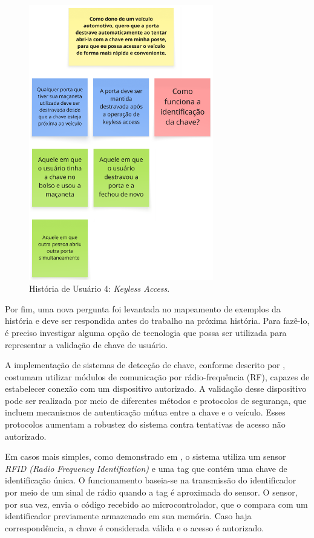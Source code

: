 \begin{figure}[H]
\centering
\includegraphics[height=12cm]{figuras/user_story_4.png}
\caption{História de Usuário 4: \textit{Keyless Access}.}
\label{fig:historia4}
\end{figure}

Por fim, uma nova pergunta foi levantada no mapeamento de exemplos da história e deve ser respondida antes do trabalho na próxima história. Para fazê-lo, é 
preciso investigar alguma opção de tecnologia que possa ser utilizada para representar a validação de chave de usuário. 

A implementação de sistemas de detecção de chave, conforme descrito por , costumam utilizar módulos de comunicação por rádio-frequência (RF), 
capazes de estabelecer conexão com um dispositivo autorizado. A validação desse dispositivo pode ser realizada por meio de diferentes métodos e protocolos de segurança, 
que incluem mecanismos de autenticação mútua entre a chave e o veículo. Esses protocolos aumentam a robustez do sistema contra tentativas de acesso não autorizado.

Em casos mais simples, como demonstrado em , o sistema utiliza um sensor \textit{RFID (Radio Frequency Identification)} e uma tag que contém uma chave 
de identificação única. O funcionamento baseia-se na transmissão do identificador por meio de um sinal de rádio quando a tag é aproximada do sensor. O sensor, 
por sua vez, envia o código recebido ao microcontrolador, que o compara com um identificador previamente armazenado em sua memória. Caso haja correspondência, 
a chave é considerada válida e o acesso é autorizado.

